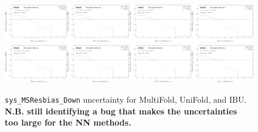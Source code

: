 \begin{figure}[h!]
\includegraphics[width=0.25\textwidth,page=134]{figures/SimResults/Lepton_SystEffect.pdf}\includegraphics[width=0.25\textwidth,page=142]{figures/SimResults/Lepton_SystEffect.pdf}\includegraphics[width=0.25\textwidth,page=150]{figures/SimResults/Lepton_SystEffect.pdf}\includegraphics[width=0.25\textwidth,page=158]{figures/SimResults/Lepton_SystEffect.pdf}\\
\includegraphics[width=0.25\textwidth,page=166]{figures/SimResults/Lepton_SystEffect.pdf}\includegraphics[width=0.25\textwidth,page=174]{figures/SimResults/Lepton_SystEffect.pdf}\includegraphics[width=0.25\textwidth,page=182]{figures/SimResults/Lepton_SystEffect.pdf}\includegraphics[width=0.25\textwidth,page=190]{figures/SimResults/Lepton_SystEffect.pdf}
\caption{\texttt{sys\_MSResbias\_Down} uncertainty for MultiFold, UniFold, and IBU.  \textbf{N.B. still identifying a bug that makes the uncertainties too large for the NN methods.}}
\label{fig:simresultsmulti_Leptonuncertsl6}
\end{figure}

